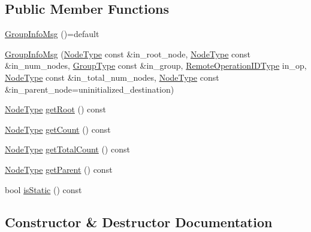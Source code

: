 \subsection*{Public Member Functions}
\begin{DoxyCompactItemize}
\item 
\hyperlink{structvt_1_1group_1_1_group_info_msg_a2b815dd4e8e961d04e3c118f486acf18}{Group\+Info\+Msg} ()=default
\item 
\hyperlink{structvt_1_1group_1_1_group_info_msg_a8d7363206ca034b3f3f45b790c6ecf35}{Group\+Info\+Msg} (\hyperlink{namespacevt_a866da9d0efc19c0a1ce79e9e492f47e2}{Node\+Type} const \&in\+\_\+root\+\_\+node, \hyperlink{namespacevt_a866da9d0efc19c0a1ce79e9e492f47e2}{Node\+Type} const \&in\+\_\+num\+\_\+nodes, \hyperlink{namespacevt_a27b5e4411c9b6140c49100e050e2f743}{Group\+Type} const \&in\+\_\+group, \hyperlink{namespacevt_1_1group_a73f2624ddeb535b39a08b6524f26b244}{Remote\+Operation\+I\+D\+Type} in\+\_\+op, \hyperlink{namespacevt_a866da9d0efc19c0a1ce79e9e492f47e2}{Node\+Type} const \&in\+\_\+total\+\_\+num\+\_\+nodes, \hyperlink{namespacevt_a866da9d0efc19c0a1ce79e9e492f47e2}{Node\+Type} const \&in\+\_\+parent\+\_\+node=uninitialized\+\_\+destination)
\item 
\hyperlink{namespacevt_a866da9d0efc19c0a1ce79e9e492f47e2}{Node\+Type} \hyperlink{structvt_1_1group_1_1_group_info_msg_a9c7a80de634653780f854d80a2b3cc7c}{get\+Root} () const
\item 
\hyperlink{namespacevt_a866da9d0efc19c0a1ce79e9e492f47e2}{Node\+Type} \hyperlink{structvt_1_1group_1_1_group_info_msg_af2b70c6fd25cf88a0901498fab9cf5a3}{get\+Count} () const
\item 
\hyperlink{namespacevt_a866da9d0efc19c0a1ce79e9e492f47e2}{Node\+Type} \hyperlink{structvt_1_1group_1_1_group_info_msg_ae344bd8126dfc617429cb4f887be7d34}{get\+Total\+Count} () const
\item 
\hyperlink{namespacevt_a866da9d0efc19c0a1ce79e9e492f47e2}{Node\+Type} \hyperlink{structvt_1_1group_1_1_group_info_msg_a46affd5f499b8de1336c21f7e044b4d2}{get\+Parent} () const
\item 
bool \hyperlink{structvt_1_1group_1_1_group_info_msg_a9b59ffc275041b6a04c4aa61f10b4f79}{is\+Static} () const
\end{DoxyCompactItemize}


\subsection{Constructor \& Destructor Documentation}
\mbox{\label{structvt_1_1group_1_1_group_info_msg_a2b815dd4e8e961d04e3c118f486acf18}} 
